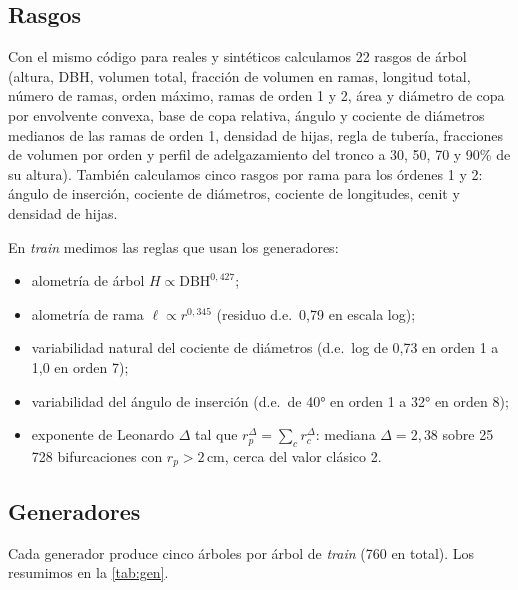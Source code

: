 \documentclass[11pt,a4paper]{article}
\begin{document}
\subsection{Rasgos}
Con el mismo código para reales y sintéticos calculamos 22 rasgos de árbol (altura, DBH, volumen total, fracción de volumen en ramas, longitud total, número de ramas, orden máximo, ramas de orden 1 y 2, área y diámetro de copa por envolvente convexa, base de copa relativa, ángulo y cociente de diámetros medianos de las ramas de orden 1, densidad de hijas, regla de tubería, fracciones de volumen por orden y perfil de adelgazamiento del tronco a 30, 50, 70 y 90\% de su altura). También calculamos cinco rasgos por rama para los órdenes 1 y 2: ángulo de inserción, cociente de diámetros, cociente de longitudes, cenit y densidad de hijas.

En \emph{train} medimos las reglas que usan los generadores:
\begin{itemize}
  \item alometría de árbol $H \propto \text{DBH}^{0{,}427}$;
  \item alometría de rama $\ell \propto r^{0{,}345}$ (residuo d.e.\ 0,79 en escala log);
  \item variabilidad natural del cociente de diámetros (d.e.\ log de 0,73 en orden 1 a 1,0 en orden 7);
  \item variabilidad del ángulo de inserción (d.e.\ de 40° en orden 1 a 32° en orden 8);
  \item exponente de Leonardo $\Delta$ tal que $r_p^{\Delta} = \sum_c r_c^{\Delta}$: mediana $\Delta = 2{,}38$ sobre 25\,728 bifurcaciones con $r_p > 2$\,cm, cerca del valor clásico 2.
\end{itemize}

\subsection{Generadores}
Cada generador produce cinco árboles por árbol de \emph{train} (760 en total). Los resumimos en la \cref{tab:gen}.
\end{document}
